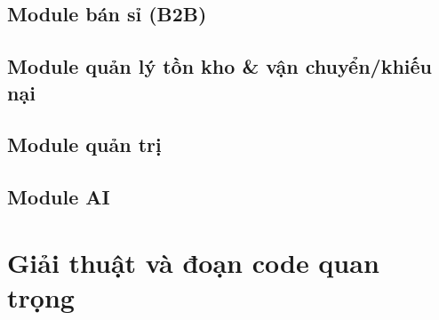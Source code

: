 \subsection{Module bán sỉ (B2B)}

\subsection{Module quản lý tồn kho \& vận chuyển/khiếu nại}

\subsection{Module quản trị}

\subsection{Module AI}
\label{sec:hienthucAI}

\section{Giải thuật và đoạn code quan trọng}
\label{sec:giaithuat}

